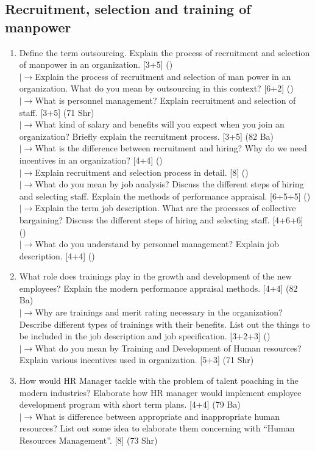 \documentclass[12pt]{article}
\newcommand{\lb}{\\$\left|\rightarrow\right.$}
\begin{document}
  \subsection{Recruitment, selection and training of manpower}
    \begin{enumerate}[topsep=0pt, noitemsep]
      \item Define the term outsourcing. Explain the process of recruitment and selection of manpower in an organization. \hfill [3+5] ()
        \lb Explain the process of recruitment and selection of man power in an organization. What do you mean by outsourcing in this context? \hfill [6+2] ()
        \lb What is personnel management? Explain recruitment and selection of staff. \hfill [3+5] (71 Shr)
        \lb What kind of salary and benefits will you expect when you join an organization? Briefly explain the recruitment process. \hfill [3+5] (82 Ba)
        \lb What is the difference between recruitment and hiring? Why do we need incentives in an organization? \hfill [4+4] ()
        \lb Explain recruitment and selection process in detail. \hfill [8] ()
        \lb What do you mean by job analysis? Discuss the different steps of hiring and selecting staff. Explain the methods of performance appraisal. \hfill [6+5+5] ()
        \lb Explain the term job description. What are the processes of collective bargaining? Discuss the different steps of hiring and selecting staff. \hfill [4+6+6] ()
        \lb What do you understand by personnel management? Explain job description. \hfill [4+4] ()

      \item What role does trainings play in the growth and development of the new employees? Explain the modern performance appraisal methods. \hfill [4+4] (82 Ba)
        \lb Why are trainings and merit rating necessary in the organization? Describe different types of trainings with their benefits. List out the things to be included in the job description and job specification. \hfill [3+2+3] ()
        \lb What do you mean by Training and Development of Human resources? Explain various incentives used in organization. \hfill [5+3] (71 Shr)

      \item How would HR Manager tackle with the problem of talent poaching in the modern industries? Elaborate how HR manager would implement employee development program with short term plans. \hfill [4+4] (79 Ba)
        \lb What is difference between appropriate and inappropriate human resources? List out some idea to elaborate them concerning with ``Human Resources Management''. \hfill [8] (73 Shr)
    \end{enumerate}
\end{document}
